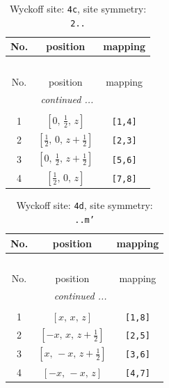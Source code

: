 \documentclass[fleqn,8pt]{jsarticle}
\begin{document}
\renewcommand{\arraystretch}{1.2}
\begin{longtable}{ccc}
\caption{Wyckoff site: {\tt 4c}, site symmetry: {\tt 2..}}
 \\
 \hline \hline
No. & position & mapping \\ \hline \endfirsthead

\multicolumn{2}{l}{\tablename\ \thetable{}} \\
 \hline \hline
No. & position & mapping \\ \hline \endhead

 \hline \hline
\multicolumn{2}{r}{\footnotesize\it continued ...} \\ \endfoot

 \hline \hline
\multicolumn{2}{r}{} \\ \endlastfoot

1 & $\left[ 0,\, \frac{1}{2},\, z \right]$ & {\tt [1,4]} \\ \hline
2 & $\left[ \frac{1}{2},\, 0,\, z + \frac{1}{2} \right]$ & {\tt [2,3]} \\ \hline
3 & $\left[ 0,\, \frac{1}{2},\, z + \frac{1}{2} \right]$ & {\tt [5,6]} \\ \hline
4 & $\left[ \frac{1}{2},\, 0,\, z \right]$ & {\tt [7,8]} \\
\end{longtable}
\renewcommand{\arraystretch}{1.2}
\begin{longtable}{ccc}
\caption{Wyckoff site: {\tt 4d}, site symmetry: {\tt ..m'}}
 \\
 \hline \hline
No. & position & mapping \\ \hline \endfirsthead

\multicolumn{2}{l}{\tablename\ \thetable{}} \\
 \hline \hline
No. & position & mapping \\ \hline \endhead

 \hline \hline
\multicolumn{2}{r}{\footnotesize\it continued ...} \\ \endfoot

 \hline \hline
\multicolumn{2}{r}{} \\ \endlastfoot

1 & $\left[ x,\, x,\, z \right]$ & {\tt [1,8]} \\ \hline
2 & $\left[ - x,\, x,\, z + \frac{1}{2} \right]$ & {\tt [2,5]} \\ \hline
3 & $\left[ x,\, - x,\, z + \frac{1}{2} \right]$ & {\tt [3,6]} \\ \hline
4 & $\left[ - x,\, - x,\, z \right]$ & {\tt [4,7]} \\
\end{longtable}
\end{document}
